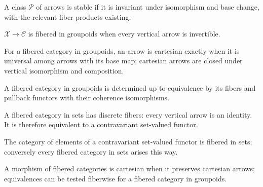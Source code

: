 \begin{definition}\label{fga-def-3-16}\uses{}
A class $\mathcal P$ of arrows is stable if it is invariant under isomorphism
and base change, with the relevant fiber products existing.
\end{definition}\begin{definition}\label{fga-def-3-21}
$\mathcal X\to\mathcal C$ is fibered in groupoids when every vertical arrow is
invertible.
\end{definition}
\begin{proposition}\label{fga-prop-3-22}
For a fibered category in groupoids, an arrow is cartesian exactly when it is
universal among arrows with its base map; cartesian arrows are closed under
vertical isomorphism and composition.
\end{proposition}
\begin{corollary}\label{fga-cor-3-23}
A fibered category in groupoids is determined up to equivalence by its fibers and
pullback functors with their coherence isomorphisms.
\end{corollary}

\begin{definition}\label{fga-def-3-24}
A fibered category in sets has discrete fibers: every vertical arrow is an
identity.  It is therefore equivalent to a contravariant set-valued functor.
\end{definition}
\begin{proposition}\label{fga-prop-3-25}
The category of elements of a contravariant set-valued functor is fibered in
sets; conversely every fibered category in sets arises this way.
\end{proposition}
\begin{proposition}\label{fga-prop-3-26}
A morphism of fibered categories is cartesian when it preserves cartesian arrows;
equivalences can be tested fiberwise for a fibered category in groupoids.
\end{proposition}

